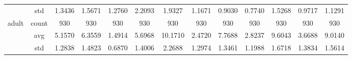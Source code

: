 \begin{table}[htbp]
{\begin{tabular}{rcccccccccccc}
			                                   & std                                    & 1.3436                                                                             & 1.5671                                                                    & 1.2760                                                                    & 2.2093                                                                    & 1.9327                                        & 1.1671                                      & 0.9030                                         & 0.7740                                         & 1.5268                                         & 0.9717                                         & 1.1291                                         \\
			adult                              & count                                  & 930                                                                                & 930                                                                       & 930                                                                       & 930                                                                       & 930                                           & 930                                         & 930                                            & 930                                            & 930                                            & 930                                            & 930                                            \\
			                                   & avg                                    & 5.1570                                                                             & 6.3559                                                                    & \cellcolor[rgb]{ .776,  .937,  .808}\textcolor[rgb]{ 0,  .38,  0}{1.4914} & 5.6968                                                                    & 10.1710                                       & 2.4720                                      & 7.7688                                         & 2.8237                                         & 9.6043                                         & 3.6688                                         & 9.0140                                         \\
			                                   & std                                    & 1.2838                                                                             & 1.4823                                                                    & 0.6870                                                                    & 1.4006                                                                    & 2.2688                                        & 1.2974                                      & 1.3461                                         & 1.1988                                         & 1.6718                                         & 1.3834                                         & 1.5614                                         \\

\end{tabular}}
\end{table}

